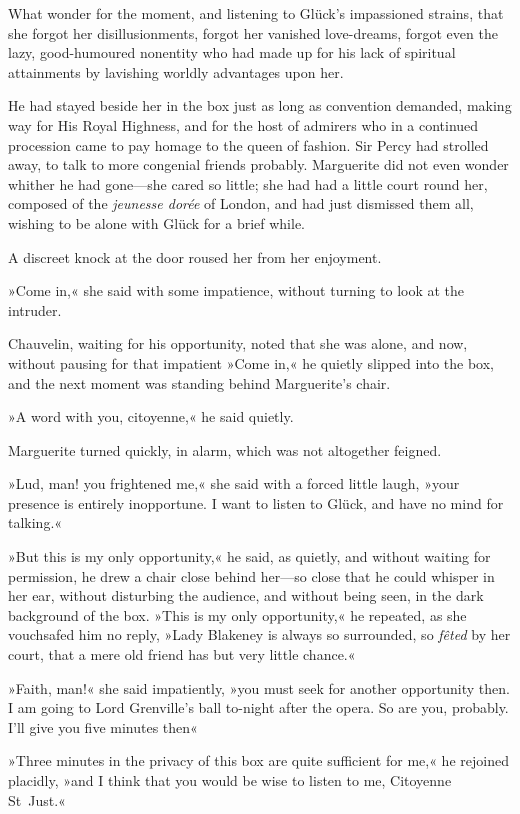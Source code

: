 What wonder for the moment, and listening to Glück's impassioned strains, that she forgot her disillusionments, forgot her vanished love-dreams, forgot even the lazy, good-humoured nonentity who had made up for his lack of spiritual attainments by lavishing worldly advantages upon her.

He had stayed beside her in the box just as long as convention demanded, making way for His Royal Highness, and for the host of admirers who in a continued procession came to pay homage to the queen of fashion. Sir Percy had strolled away, to talk to more congenial friends probably. Marguerite did not even wonder whither he had gone—she cared so little; she had had a little court round her, composed of the \textit{jeunesse dorée} of London, and had just dismissed them all, wishing to be alone with Glück for a brief while.

A discreet knock at the door roused her from her enjoyment.

»Come in,« she said with some impatience, without turning to look at the intruder.

Chauvelin, waiting for his opportunity, noted that she was alone, and now, without pausing for that impatient »Come in,« he quietly slipped into the box, and the next moment was standing behind Marguerite's chair.

»A word with you, citoyenne,« he said quietly.

Marguerite turned quickly, in alarm, which was not altogether feigned.

»Lud, man! you frightened me,« she said with a forced little laugh, »your presence is entirely inopportune. I want to listen to Glück, and have no mind for talking.«

»But this is my only opportunity,« he said, as quietly, and without waiting for permission, he drew a chair close behind her—so close that he could whisper in her ear, without disturbing the audience, and without being seen, in the dark background of the box. »This is my only opportunity,« he repeated, as she vouchsafed him no reply, »Lady Blakeney is always so surrounded, so \textit{fêted} by her court, that a mere old friend has but very little chance.«

»Faith, man!« she said impatiently, »you must seek for another opportunity then. I am going to Lord Grenville's ball to-night after the opera. So are you, probably. I'll give you five minutes then\textellipsis«

»Three minutes in the privacy of this box are quite sufficient for me,« he rejoined placidly, »and I think that you would be wise to listen to me, Citoyenne St~Just.«

